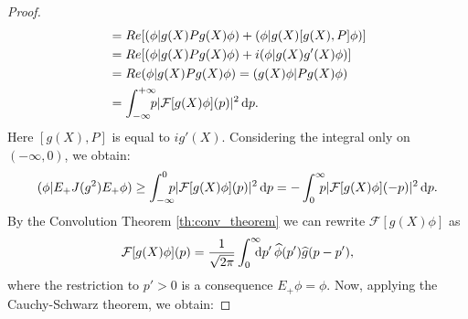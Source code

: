 \begin{proof}
\begin{equation}
\begin{aligned}
	& = Re[(\phi|g(X)Pg(X)\phi)+(\phi|g(X)[g(X),P]\phi)]\\
	& = Re[(\phi|g(X)Pg(X)\phi)+i(\phi|g(X)g'(X)\phi)]\\
	& = Re(\phi|g(X)Pg(X)\phi)=(g(X)\phi|Pg(X)\phi)\\
	& = \int_{-\infty}^{+\infty}\!\!\!\!p|\mathcal{F}[g(X)\phi](p)|^2\, \mathrm d p.
	\end{aligned}
	\end{equation}
	Here $[g(X),P]$ is equal to $ig'(X)$. Considering the integral only on $(-\infty,0)$, we obtain:
	\begin{equation}
	(\phi|E_+J(g^2)E_+\phi)\ge\int_{-\infty}^{0}\nspace\! p|\mathcal{F}[g(X)\phi](p)|^2\, \dd p=-\int_{0}^{\infty}\nspace\!p|\mathcal{F}[g(X)\phi](-p)|^2\, \dd p.
	\label{eq:gsquare}
	\end{equation}
	By the Convolution Theorem \ref{th:conv_theorem} we can rewrite $\mathcal{F}[g(X)\phi]$ as
	\begin{equation}
	\mathcal{F}[g(X)\phi](p)=\frac{1}{\sqrt{2\pi}}\int_{0}^{\infty}\!\!\!\! \mathrm d p'\, \widehat{\phi}(p')\widehat{g}(p-p'),
	\end{equation}
	where the restriction to $p'>0$ is a consequence $E_+\phi=\phi$. Now, applying the Cauchy-Schwarz theorem, we obtain:
	

\end{proof}
